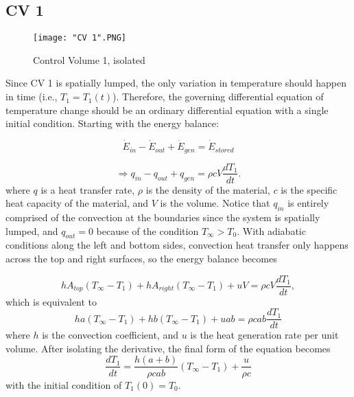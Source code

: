 \documentclass{article}
\newcommand{\EE}{\dot{E}}
\begin{document}
\subsection*{CV 1}

\begin{figure}[ht!]
    \centering
    \texttt{[image: "CV 1".PNG]}
    \caption{Control Volume 1, isolated}
    \label{fig:figure 2}
\end{figure}

Since CV 1 is spatially lumped, the only variation in temperature should happen in time (i.e., $T_1 = T_1(t)$). Therefore, the governing differential equation of temperature change should be an ordinary differential equation with a single initial condition. Starting with the energy balance:

\begin{equation}
    \EE_{in} - \EE_{out} + \EE_{gen} = \EE_{stored}
    \label{ebal}
\end{equation}

\begin{equation}
    \Rightarrow q_{in} - q_{out} + q_{gen} = \rho c V \frac{dT_1}{dt}.
    \label{qbal}
\end{equation}
where $q$ is a heat transfer rate, $\rho$ is the density of the material, $c$ is the specific heat capacity of the material, and $V$ is the volume. Notice that $q_{in}$ is entirely comprised of the convection at the boundaries since the system is spatially lumped, and $q_{out} = 0$ because of the condition $T_\infty > T_0$. With adiabatic conditions along the left and bottom sides, convection heat transfer only happens across the top and right surfaces, so the energy balance becomes

\begin{equation}
    hA_{top}(T_\infty - T_1) + hA_{right}(T_\infty - T_1) + uV = \rho c V \frac{dT_1}{dt},
\end{equation}
which is equivalent to
\begin{equation}
    ha(T_\infty - T_1) + hb(T_\infty - T_1) + uab = \rho c ab \frac{dT_1}{dt}
\end{equation}
where $h$ is the convection coefficient, and $u$ is the heat generation rate per unit volume. After isolating the derivative, the final form of the equation becomes
\begin{equation}
    \frac{dT_1}{dt} = \frac{h(a+b)}{\rho c ab} (T_\infty - T_1) + \frac{u}{\rho c}
\end{equation}
with the initial condition of $T_1(0) = T_0$.
\end{document}
